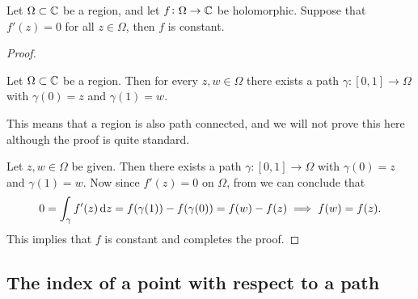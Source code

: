 \documentclass[11pt,a4paper]{article}
\begin{document}
\begin{corollary}
  Let $\Omega \subset \mathbb{C}$ be a region, and let $f \colon \Omega \to \mathbb{C}$
  be holomorphic.
  Suppose that $f'(z) = 0$ for all $z \in \Omega$, then $f$ is constant.
\end{corollary}
\begin{proof}
  \begin{lemma}
    Let $\Omega \subset \mathbb{C}$ be a region.
    Then for every $z, w \in \Omega$ there exists a path
    $\gamma \colon [0, 1] \to \Omega$ with $\gamma(0) = z$ and $\gamma(1) = w$.
  \end{lemma}
  This means that a region is also path connected, and we will not prove this
  here although the proof is quite standard.

  Let $z,w \in \Omega$ be given.
  Then there exists a path $\gamma \colon [0, 1] \to \Omega$ with
  $\gamma(0) = z$ and $\gamma(1) = w$.
  Now since $f'(z) = 0$ on $\Omega$, from  we can conclude
  that
  \[
    0 = \int_{\gamma} f'(z) \dz = f(\gamma(1)) - f(\gamma(0)) = f(w) - f(z)
    \implies
    f(w) = f(z).
  \]
  This implies that $f$ is constant and completes the proof.
\end{proof}

\subsection{The index of a point with respect to a path}
\end{document}
